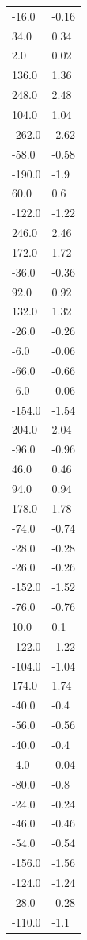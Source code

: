 \begin{longtable}{ll}
-16.0 & -0.16 \\
34.0 & 0.34 \\
2.0 & 0.02 \\
136.0 & 1.36 \\
248.0 & 2.48 \\
104.0 & 1.04 \\
-262.0 & -2.62 \\
-58.0 & -0.58 \\
-190.0 & -1.9 \\
60.0 & 0.6 \\
-122.0 & -1.22 \\
246.0 & 2.46 \\
172.0 & 1.72 \\
-36.0 & -0.36 \\
92.0 & 0.92 \\
132.0 & 1.32 \\
-26.0 & -0.26 \\
-6.0 & -0.06 \\
-66.0 & -0.66 \\
-6.0 & -0.06 \\
-154.0 & -1.54 \\
204.0 & 2.04 \\
-96.0 & -0.96 \\
46.0 & 0.46 \\
94.0 & 0.94 \\
178.0 & 1.78 \\
-74.0 & -0.74 \\
-28.0 & -0.28 \\
-26.0 & -0.26 \\
-152.0 & -1.52 \\
-76.0 & -0.76 \\
10.0 & 0.1 \\
-122.0 & -1.22 \\
-104.0 & -1.04 \\
174.0 & 1.74 \\
-40.0 & -0.4 \\
-56.0 & -0.56 \\
-40.0 & -0.4 \\
-4.0 & -0.04 \\
-80.0 & -0.8 \\
-24.0 & -0.24 \\
-46.0 & -0.46 \\
-54.0 & -0.54 \\
-156.0 & -1.56 \\
-124.0 & -1.24 \\
-28.0 & -0.28 \\
-110.0 & -1.1 \\

\end{longtable}
